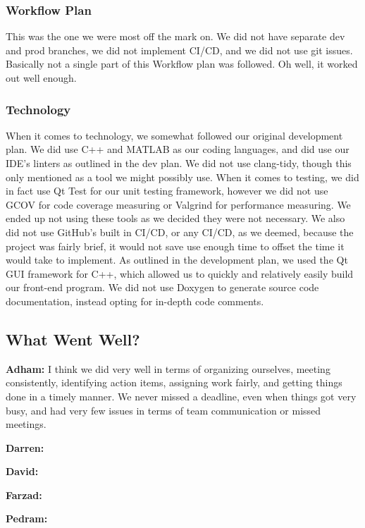 \documentclass{article}
\begin{document}
\subsubsection{Workflow Plan}
This was the one we were most off the mark on. We did not have separate dev and prod branches, we did not implement CI/CD, and we did not use git issues. Basically not a single
part of this Workflow plan was followed. Oh well, it worked out well enough.


\subsubsection{Technology}
When it comes to technology, we somewhat followed our original development plan. We did use C++ and MATLAB as our coding languages, 
and did use our IDE's linters as outlined in the dev plan. We did not use clang-tidy, though this only mentioned as a tool we might possibly use. 
When it comes to testing, we did in fact use Qt Test for our unit testing framework, however we did not use GCOV for code coverage measuring or Valgrind 
for performance measuring. We ended up not using these tools as we decided they were not necessary. We also did not use GitHub's built in CI/CD, or any CI/CD, 
as we deemed, because the project was fairly brief, it would not save use enough time to offset the time it would take to implement. As outlined in the development plan, 
we used the Qt GUI framework for C++, which allowed us to quickly and relatively easily build our front-end program. We did not use Doxygen to generate source code 
documentation, instead opting for in-depth code comments.

\subsection{What Went Well?}

\textbf{Adham:} I think we did very well in terms of organizing ourselves, meeting consistently, identifying action items, assigning work fairly, and getting things done in 
a timely manner. We never missed a deadline, even when things got very busy, and had very few issues in terms of team communication or missed meetings.

\textbf{Darren:}

\textbf{David:}

\textbf{Farzad:}

\textbf{Pedram:}
\end{document}
